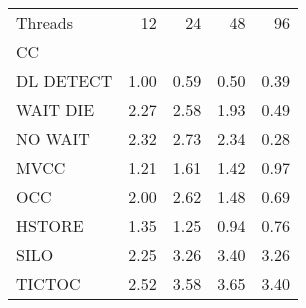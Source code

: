 \begin{tabular}{lrrrr}
\toprule
Threads &   12 &   24 &   48 &   96 \\
CC        &      &      &      &      \\
\midrule
DL DETECT & 1.00 & 0.59 & 0.50 & 0.39 \\
WAIT DIE  & 2.27 & 2.58 & 1.93 & 0.49 \\
NO WAIT   & 2.32 & 2.73 & 2.34 & 0.28 \\
MVCC      & 1.21 & 1.61 & 1.42 & 0.97 \\
OCC       & 2.00 & 2.62 & 1.48 & 0.69 \\
HSTORE    & 1.35 & 1.25 & 0.94 & 0.76 \\
SILO      & 2.25 & 3.26 & 3.40 & 3.26 \\
TICTOC    & 2.52 & 3.58 & 3.65 & 3.40 \\
\bottomrule
\end{tabular}
